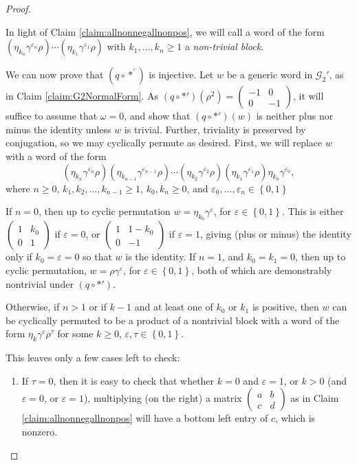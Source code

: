 \documentclass{amsart}     %
\newcommand{\set}[1]{ \left\{ #1 \right\} }
\theoremstyle{definition}
\begin{document}
\begin{proof}
\begin{description}
In light of Claim \ref{claim:allnonnegallnonpos}, we will call a word of the form $\left( \eta_{k_{n}}\gamma^{\varepsilon_{n}}\rho \right) \cdots \left( \eta_{k_1}\gamma^{\varepsilon_1}\rho \right)$ with $k_1, \dots, k_n \geq 1$ a \emph{non-trivial block}.

We can now prove that $ \left( q \circ *^{'} \right) $ is injective. Let $w$ be a generic word in $\mathcal{G}_2'$, as in Claim \ref{claim:G2NormalForm}. As $\left(q \circ *' \right)(\rho^2) = \begin{pmatrix} -1 & 0 \\ 0 & -1 \end{pmatrix}$, it will suffice to assume that $\omega  = 0$, and show that $\left( q \circ *' \right)(w)$ is neither plus nor minus the identity unless $w$ is trivial. Further, triviality is preserved by conjugation, so we may cyclically permute as desired. First, we will replace $w$ with a word of the form
\[ (\eta_{k_n}\gamma^{\varepsilon_n}\rho) (\eta_{k_{n-1}}\gamma^{\varepsilon_{n-1}}\rho)\cdots (\eta_{k_2}\gamma^{\varepsilon_2}\rho) (\eta_{k_1}\gamma^{\varepsilon_1}\rho) \eta_{k_0} \gamma^{\varepsilon_{0}}, \]
%
where $n \geq 0$,  $k_1, k_2, \dots, k_{n-1} \geq 1$, $k_0, k_n \geq 0$, and $\varepsilon_0, \dots, \varepsilon_{n} \in \set{0, 1}$

If $n = 0$, then up to cyclic permutation $w = \eta_{k_0} \gamma^{\varepsilon}$, for $\varepsilon \in \set{0, 1}$. This is either $\begin{pmatrix} 1 & k_0 \\ 0 & 1 \end{pmatrix}$ if $\varepsilon = 0$, or $\begin{pmatrix} 1 & 1-k_0 \\ 0 & -1 \end{pmatrix}$ if $\varepsilon=1$, giving (plus or minus) the identity only if $k_0 = \varepsilon = 0$ so that $w$ is the identity. If $n = 1$, and $k_0 = k_1 = 0$, then up to cyclic permutation, $w = \rho \gamma^\varepsilon$, for $\varepsilon \in \set{0, 1}$, both of which are demonstrably nontrivial under $\left( q \circ *'\right)$.

Otherwise, if $n > 1$ or if $k-1$ and at least one of $k_0$ or $k_1$ is positive, then $w$ can be cyclically permuted to be a product of a nontrivial block with a word of the form $\eta_k \gamma^{\varepsilon} \rho^\tau$ for some $k \geq 0$, $\varepsilon, \tau \in \set{0, 1}$. 

This leaves only a few cases left to check:
\begin{enumerate}
\item If $\tau = 0$, then it is easy to check that whether $k=0$ and $\varepsilon = 1$, or $k>0$ (and $\varepsilon = 0$, or $\varepsilon =1$), multiplying (on the right) a matrix $\begin{pmatrix} a & b \\ c & d \end{pmatrix}$ as in Claim \ref{claim:allnonnegallnonpos} will have a bottom left entry of $c$, which is nonzero.


\end{enumerate}
\end{description}
\end{proof}
\end{document}
